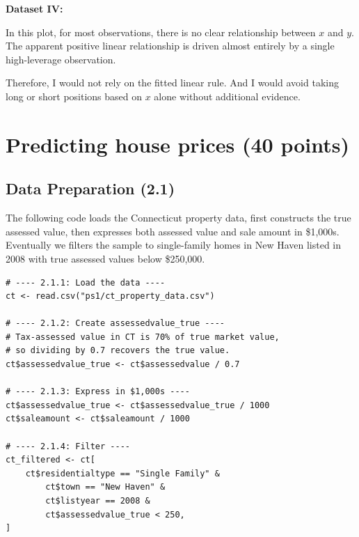 \documentclass[11pt]{article}
\begin{document}
\vspace{1em}

\noindent\textbf{Dataset IV:}

In this plot, for most observations, there is no clear relationship between $x$ and $y$. The apparent positive linear relationship is driven almost entirely by a single high-leverage observation.

Therefore, I would not rely on the fitted linear rule. And I would avoid taking long or short positions based on $x$ alone without additional evidence.

\section{Predicting house prices (40 points)}

\subsection{Data Preparation (2.1)}

The following code loads the Connecticut property data, first constructs the
true assessed value, then expresses both assessed value and sale amount in
\$1,000s. Eventually we filters the sample to single-family homes in New Haven
listed in 2008 with true assessed values below \$250,000.

\vspace{0.5em}

\begin{lstlisting}[style=rcode]
# ---- 2.1.1: Load the data ----
ct <- read.csv("ps1/ct_property_data.csv")

# ---- 2.1.2: Create assessedvalue_true ----
# Tax-assessed value in CT is 70% of true market value,
# so dividing by 0.7 recovers the true value.
ct$assessedvalue_true <- ct$assessedvalue / 0.7

# ---- 2.1.3: Express in $1,000s ----
ct$assessedvalue_true <- ct$assessedvalue_true / 1000
ct$saleamount <- ct$saleamount / 1000

# ---- 2.1.4: Filter ----
ct_filtered <- ct[
    ct$residentialtype == "Single Family" &
        ct$town == "New Haven" &
        ct$listyear == 2008 &
        ct$assessedvalue_true < 250,
]
\end{lstlisting}

\vspace{0.5em}
\end{document}
